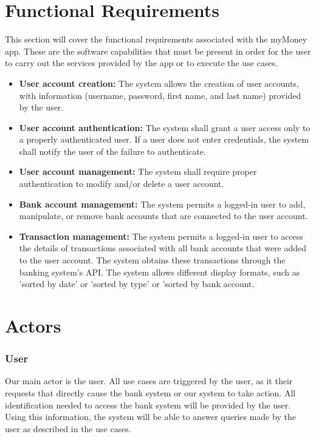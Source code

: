 \documentclass[11pt]{article}
\newcounter{use case ID}
\newcounter{req ID}
\begin{document}
\section{Functional Requirements}

This section will cover the functional requirements associated with the myMoney app. These are the software capabilities that must be present in order for the user to carry out the services provided by the app or to execute the use cases.

\begin{itemize}
    \item  \textbf{User account creation:} The system allows the creation of user accounts, with information (username, password, first name, and last name) provided by the user.
    \item \textbf{User account authentication:} The system shall grant a user access only to a properly authenticated user. If a user does not enter credentials, the system shall notify the user of the failure to authenticate.
    \item \textbf{User account management:} The system shall require proper authentication to modify and/or delete a user account.
    \item  \textbf{Bank account management:} The system permits a logged-in user to add, manipulate, or remove bank accounts that are connected to the user account.
    \item  \textbf{Transaction management:} The system permits a logged-in user to access the details of transactions associated with all bank accounts that were added to the user account. The system obtains these transactions through the banking system's API. The system allows different display formats, such as 'sorted by date' or 'sorted by type' or 'sorted by bank account.
    \end{itemize}

\section{Actors}
\subsubsection{User}
Our main actor is the user. All use cases are triggered by the user, as it their requests that directly cause the bank system or our system to take action. All identification needed to access the bank system will be provided by the user. Using this information, the system will be able to answer queries made by the user as described in the use cases.
\end{document}
